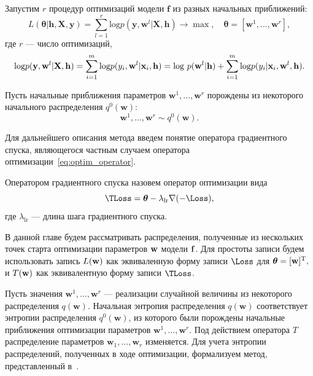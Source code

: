 Запустим $r$ процедур оптимизаций модели $\mathbf{f}$ из разных начальных приближений:
\[
	L( \boldsymbol{\theta}| \mathbf{h}, \mathbf{X}, \mathbf{y}) = \sum_{l=1}^r \text{log}p(\mathbf{y}, \mathbf{w}^l|\mathbf{X}, \mathbf{h})  \to \max, \quad \boldsymbol{\theta} = [\mathbf{w}^1, \dots, \mathbf{w}^r],
\] 
где $r$ --- число оптимизаций,
\begin{equation}
\label{eq:loss_func}
\text{log}p(\mathbf{y}, \mathbf{w}^l|\mathbf{X}, \mathbf{h}) = \sum_{i=1}^m \textnormal{log}p({y}_i, \mathbf{w}^l |\mathbf{x}_i, \mathbf{h}) = \textnormal{log}~p(\mathbf{w}^l|\mathbf{h}) + \sum_{i=1}^m \textnormal{log}p({y}_i |\mathbf{x}_i, \mathbf{w}^l, \mathbf{h}).
\end{equation}

Пусть начальные приближения параметров $\mathbf{w}^1, \dots, \mathbf{w}^r$ порождены из некоторого начального распределения $q^0(\mathbf{w})$:
\[ 
	\mathbf{w}^1, \dots, \mathbf{w}^r \sim q^0(\mathbf{w}). 
\]




Для дальнейшего описания метода введем понятие оператора градиентного спуска, являющегося частным случаем оператора оптимизации~\eqref{eq:optim_operator}.
\begin{defin}
Оператором градиентного спуска назовем оператор оптимизации вида
\begin{equation}
\label{eq:sgd}
	\TLoss  = \boldsymbol{\theta} - \lambda_{\text{lr}} \nabla (-\Loss), 
\end{equation}
где  $\lambda_{\text{lr}}$ --- длина шага градиентного спуска.
\end{defin}
В данной главе будем рассматривать распределения, полученные из нескольких точек старта оптимизации параметров $\mathbf{w}$ модели $\mathbf{f}$. Для простоты записи будем использовать запись $L(\mathbf{w})$ как эквиваленную форму записи $\Loss$ для $\boldsymbol{\theta} = [\mathbf{w}]^\text{T},$ и $T(\mathbf{w})$  как эквивалентную форму записи $\TLoss$. 

Пусть значения $\mathbf{w}^1, \dots, \mathbf{w}^r$  --- реализации случайной величины из некоторого распределения $q(\mathbf{w})$. Начальная энтропия распределения $q(\mathbf{w})$ соответствует энтропии распределения $q^0(\mathbf{w})$, из которого были порождены начальные приближения оптимизации параметров $\mathbf{w}^1, \dots, \mathbf{w}^r$. Под действием оператора $T$ распределение параметров $\mathbf{w}_1, \dots, \mathbf{w}_r$ изменяется. Для учета энтропии распределений, полученных в ходе оптимизации,
{ формализуем метод,  представленный в~\cite{early}. }

